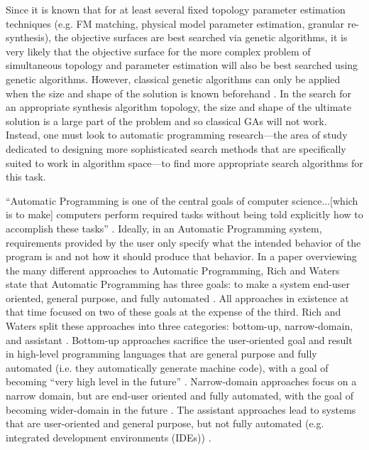 \documentclass[12pt]{report} 	%
\numberwithin{figure}{chapter}
\numberwithin{table}{chapter}
\numberwithin{equation}{chapter}
\begin{document}
\begin{flushleft}
Since it is known that for at least several fixed topology parameter estimation techniques (e.g. FM matching, physical model parameter estimation, granular re-synthesis), the objective surfaces are best searched via genetic algorithms, it is very likely that the objective surface for the more complex problem of simultaneous topology and parameter estimation will also be best searched using genetic algorithms. However, classical genetic algorithms can only be applied when the size and shape of the solution is known beforehand \cite[p. 42]{Vanneschi:2004le}. In the search for an appropriate synthesis algorithm topology, the size and shape of the ultimate solution is a large part of the problem and so classical GAs will not work. Instead, one must look to automatic programming research---the area of study dedicated to designing more sophisticated search methods that are specifically suited to work in algorithm space---to find more appropriate search algorithms for this task.

``Automatic Programming is one of the central goals of computer science...[which is to make] computers perform required tasks without being told explicitly how to accomplish these tasks'' \cite[p.3]{Koza:1997zr}. Ideally, in an Automatic Programming system, requirements provided by the user only specify what the intended behavior of the program is and not how it should produce that behavior. In a paper overviewing the many different approaches to Automatic Programming, Rich and Waters \cite{Rich:1992sp} state that Automatic Programming has three goals: to make a system end-user oriented, general purpose, and fully automated \cite[p. 4]{Rich:1992sp}. All approaches in existence at that time focused on two of these goals at the expense of the third. Rich and Waters split these approaches into three categories: bottom-up, narrow-domain, and assistant \cite[p. 3]{Rich:1992sp}. Bottom-up approaches sacrifice the user-oriented goal and result in high-level programming languages that are general purpose and fully automated (i.e. they automatically generate machine code), with a goal of becoming ``very high level in the future'' \cite[p. 3]{Rich:1992sp}. Narrow-domain approaches focus on a narrow domain, but are end-user oriented and fully automated, with the goal of becoming wider-domain in the future \cite[p. 4]{Rich:1992sp}. The assistant approaches lead to systems that are user-oriented and general purpose, but not fully automated (e.g. integrated development environments (IDEs)) \cite[p. 4]{Rich:1992sp}. 


\end{flushleft}
\end{document}
